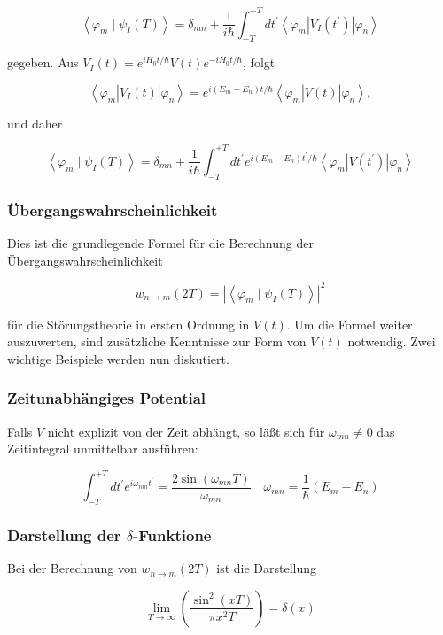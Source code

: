 \documentclass[10pt, letterpaper]{article}
\begin{document}
$$
\left\langle\varphi_{m} \mid \psi_{I}(T)\right\rangle=\delta_{m n}+\frac{1}{i \hbar} \int_{-T}^{+T} d t^{\prime}\left\langle\varphi_{m}\right| V_{I}\left(t^{\prime}\right)\left|\varphi_{n}\right\rangle
$$

gegeben. Aus $V_{I}(t)=e^{i H_{0} t / \hbar} V(t) e^{-i H_{0} t / \hbar}$, folgt

$$
\left\langle\varphi_{m}\right| V_{I}(t)\left|\varphi_{n}\right\rangle=e^{i\left(E_{m}-E_{n}\right) t / \hbar}\left\langle\varphi_{m}\right| V(t)\left|\varphi_{n}\right\rangle,
$$

und daher

$$
\left\langle\varphi_{m} \mid \psi_{I}(T)\right\rangle=\delta_{m n}+\frac{1}{i \hbar} \int_{-T}^{+T} d t^{\prime} e^{i\left(E_{m}-E_{n}\right) t^{\prime} / \hbar}\left\langle\varphi_{m}\right| V\left(t^{\prime}\right)\left|\varphi_{n}\right\rangle
$$

\subsubsection*{Übergangswahrscheinlichkeit}
Dies ist die grundlegende Formel für die Berechnung der Übergangswahrscheinlichkeit

$$
w_{n \rightarrow m}(2 T)=\left|\left\langle\varphi_{m} \mid \psi_{I}(T)\right\rangle\right|^{2}
$$

für die Störungstheorie in ersten Ordnung in $V(t)$. Um die Formel weiter auszuwerten, sind zusätzliche Kenntnisse zur Form von $V(t)$ notwendig. Zwei wichtige Beispiele werden nun diskutiert.

\subsubsection*{Zeitunabhängiges Potential}
Falls $V$ nicht explizit von der Zeit abhängt, so läßt sich für $\omega_{m n} \neq 0$ das Zeitintegral unmittelbar ausführen:

$$
\int_{-T}^{+T} d t^{\prime} e^{i \omega_{n m} t^{\prime}}=\frac{2 \sin \left(\omega_{m n} T\right)}{\omega_{m n}} \quad \omega_{m n}=\frac{1}{\hbar}\left(E_{m}-E_{n}\right)
$$

\subsubsection*{Darstellung der $\delta$-Funktione}
Bei der Berechnung von $w_{n \rightarrow m}(2 T)$ ist die Darstellung

$$
\lim _{T \rightarrow \infty}\left(\frac{\sin ^{2}(x T)}{\pi x^{2} T}\right)=\delta(x)
$$
\end{document}
